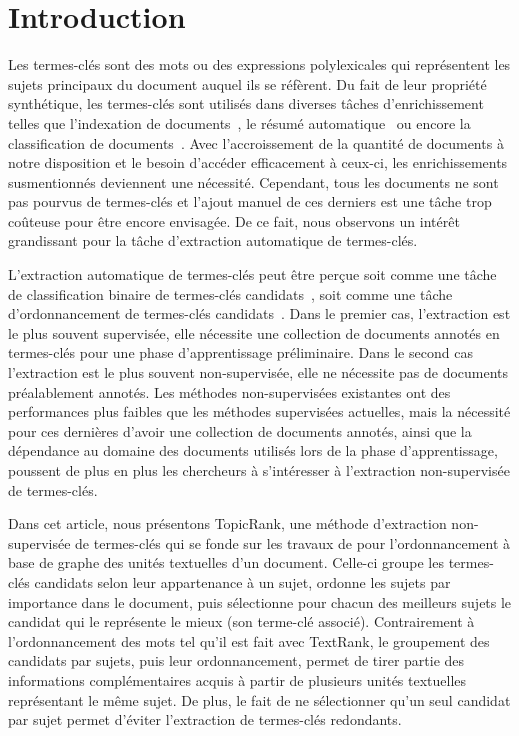 \section{Introduction}
\label{sec:introduction}
  Les termes-clés sont des mots ou des expressions polylexicales qui
  représentent les sujets principaux du document auquel ils se réfèrent.
  Du fait de leur propriété synthétique, les termes-clés sont utilisés dans
  diverses tâches d'enrichissement telles que l'indexation de
  documents~\cite{medelyan2008smalltrainingset}, le résumé
  automatique~\cite{litvak2008graphbased} ou encore la classification de
  documents~\cite{han2007webdocumentclustering}. Avec l'accroissement de la
  quantité de documents à notre disposition et le besoin d'accéder efficacement
  à ceux-ci, les enrichissements susmentionnés deviennent une nécessité.
  Cependant, tous les documents ne sont pas pourvus de termes-clés et l'ajout
  manuel de ces derniers est une tâche trop coûteuse pour être encore envisagée.
  De ce fait, nous observons un intérêt grandissant pour la tâche d'extraction
  automatique de termes-clés.

  L'extraction automatique de termes-clés peut être perçue soit comme une tâche
  de classification binaire de termes-clés candidats~\cite{witten1999kea}, soit
  comme une tâche d'ordonnancement de termes-clés
  candidats~\cite{mihalcea2004textrank}. Dans le premier cas, l'extraction est
  le plus souvent supervisée, elle nécessite une collection de documents annotés
  en termes-clés pour une phase d'apprentissage préliminaire. Dans le second cas
  l'extraction est le plus souvent non-supervisée, elle ne nécessite pas de
  documents préalablement annotés. Les méthodes non-supervisées existantes ont
  des performances plus faibles que les méthodes supervisées actuelles, mais la
  nécessité pour ces dernières d'avoir une collection de documents annotés,
  ainsi que la dépendance au domaine des documents utilisés lors de la phase
  d'apprentissage, poussent de plus en plus les chercheurs à s'intéresser à
  l'extraction non-supervisée de termes-clés.

  Dans cet article, nous présentons TopicRank, une méthode d'extraction
  non-supervisée de termes-clés qui se fonde sur les travaux de
   pour l'ordonnancement à base de
  graphe des unités textuelles d'un document. Celle-ci groupe les termes-clés
  candidats selon leur appartenance à un sujet, ordonne les sujets par
  importance dans le document, puis sélectionne pour chacun des meilleurs sujets
  le candidat qui le représente le mieux (son terme-clé associé).
  Contrairement à l'ordonnancement des mots tel qu'il est fait avec TextRank,
  le groupement des candidats par sujets, puis leur ordonnancement, permet de
  tirer partie des informations complémentaires acquis à partir de plusieurs
  unités textuelles représentant le même sujet. De plus, le fait de ne
  sélectionner qu'un seul candidat par sujet permet d'éviter l'extraction de
  termes-clés redondants.


